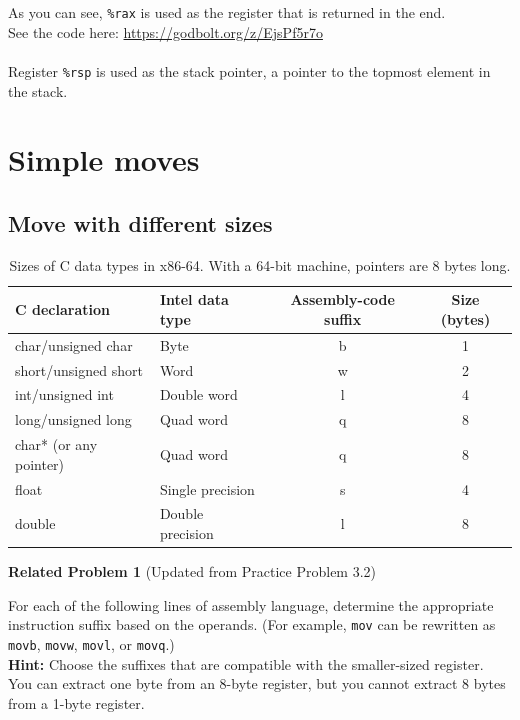 \documentclass{article}
\begin{document}
As you can see, \texttt{\%rax} is used as the register that is returned in the end. \\

See the code here: \url{https://godbolt.org/z/EjsPf5r7o} \\
\\

Register \texttt{\%rsp} is used as the stack pointer, a pointer to the topmost element in the stack.
\clearpage
\section{Simple moves}
\subsection{Move with different sizes}
\begin{table}[h]
    \centering
    \small
    \renewcommand{\arraystretch}{1.2}
    \begin{tabular}{l l c c}
        \toprule
        \textbf{C declaration} & \textbf{Intel data type} & \textbf{Assembly-code suffix} & \textbf{Size (bytes)} \\
        \midrule
        char/unsigned char     & Byte             & b  & 1 \\
        short/unsigned short    & Word             & w  & 2 \\
        int/unsigned int      & Double word      & l  & 4 \\
        long/unsigned long     & Quad word        & q  & 8 \\
        char* (or any pointer)  & Quad word        & q  & 8 \\
        float    & Single precision & s  & 4 \\
        double   & Double precision & l  & 8 \\
        \bottomrule
    \end{tabular}
    \caption{Sizes of C data types in x86-64. With a 64-bit machine, pointers are 8 bytes long.}
    \label{tab:c_data_types}
\end{table}


\noindent\textbf{Related Problem 1} (Updated from Practice Problem 3.2)

\vspace{5pt}

For each of the following lines of assembly language, determine the appropriate instruction suffix based on the operands. (For example, \texttt{mov} can be rewritten as \texttt{movb}, \texttt{movw}, \texttt{movl}, or \texttt{movq}.) \\
%
\textbf{Hint:} Choose the suffixes that are compatible with the smaller-sized register. You can extract one byte from an 8-byte register, but you cannot extract 8 bytes from a 1-byte register.
%
\end{document}
